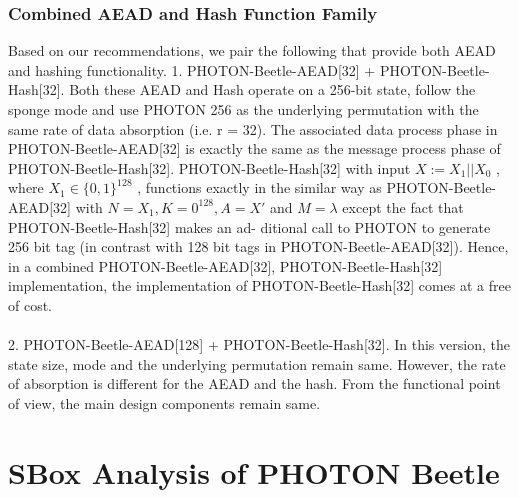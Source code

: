 \documentclass{article}
\begin{document}
\subsubsection{Combined AEAD and Hash Function Family}
Based on our recommendations, we pair the following that provide both AEAD and hashing functionality.
1. PHOTON-Beetle-AEAD[32] + PHOTON-Beetle-Hash[32]. Both these AEAD and Hash operate on a 256-bit state, follow the sponge mode and use PHOTON 256 as the underlying permutation with the same rate of data absorption (i.e. r = 32). The associated data process phase in PHOTON-Beetle-AEAD[32] is exactly the same as the message process phase of PHOTON-Beetle-Hash[32]. PHOTON-Beetle-Hash[32] with input $X := X_1||X_0$ , where $X_1 \in \{0, 1\}^{128}$ , functions exactly in the similar way as PHOTON-Beetle-AEAD[32] with $N = X_1 , K = 0^{128} , A = X'$ and $M = \lambda$ except the fact that PHOTON-Beetle-Hash[32] makes an ad-
ditional call to PHOTON to generate 256 bit tag (in contrast with 128 bit tags in PHOTON-Beetle-AEAD[32]). Hence, in a combined PHOTON-Beetle-AEAD[32], PHOTON-Beetle-Hash[32] implementation, the implementation of PHOTON-Beetle-Hash[32] comes at a free of cost.\\\\
2. PHOTON-Beetle-AEAD[128] + PHOTON-Beetle-Hash[32]. In this version, the state size, mode and the underlying permutation remain same. However, the rate of absorption is different for the AEAD and the hash. From the functional point of view, the main design components remain same.
\section{SBox Analysis of PHOTON Beetle}
\end{document}
